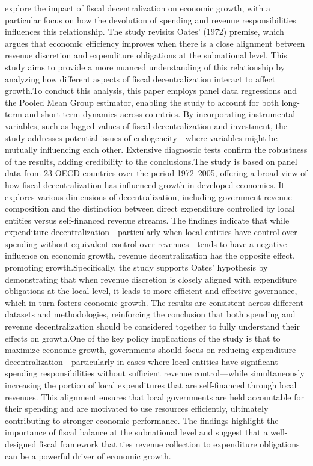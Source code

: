   explore the impact of fiscal decentralization on economic growth, with a particular focus on how the devolution of spending and revenue responsibilities influences this relationship. The study revisits Oates' (1972) premise, which argues that economic efficiency improves when there is a close alignment between revenue discretion and expenditure obligations at the subnational level. This study aims to provide a more nuanced understanding of this relationship by analyzing how different aspects of fiscal decentralization interact to affect growth.To conduct this analysis, this paper employs panel data regressions and the Pooled Mean Group estimator, enabling the study to account for both long-term and short-term dynamics across countries. By incorporating instrumental variables, such as lagged values of fiscal decentralization and investment, the study addresses potential issues of endogeneity—where variables might be mutually influencing each other. Extensive diagnostic tests confirm the robustness of the results, adding credibility to the conclusions.The study is based on panel data from 23 OECD countries over the period 1972–2005, offering a broad view of how fiscal decentralization has influenced growth in developed economies. It explores various dimensions of decentralization, including government revenue composition and the distinction between direct expenditure controlled by local entities versus self-financed revenue streams. The findings indicate that while expenditure decentralization—particularly when local entities have control over spending without equivalent control over revenues—tends to have a negative influence on economic growth, revenue decentralization has the opposite effect, promoting growth.Specifically, the study supports Oates' hypothesis by demonstrating that when revenue discretion is closely aligned with expenditure obligations at the local level, it leads to more efficient and effective governance, which in turn fosters economic growth. The results are consistent across different datasets and methodologies, reinforcing the conclusion that both spending and revenue decentralization should be considered together to fully understand their effects on growth.One of the key policy implications of the study is that to maximize economic growth, governments should focus on reducing expenditure decentralization—particularly in cases where local entities have significant spending responsibilities without sufficient revenue control—while simultaneously increasing the portion of local expenditures that are self-financed through local revenues. This alignment ensures that local governments are held accountable for their spending and are motivated to use resources efficiently, ultimately contributing to stronger economic performance. The findings highlight the importance of fiscal balance at the subnational level and suggest that a well-designed fiscal framework that ties revenue collection to expenditure obligations can be a powerful driver of economic growth.\\
